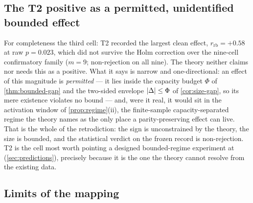 
\subsection{The T2 positive as a permitted, unidentified bounded effect}
\label{subsec:anchor-t2}

For completeness the third cell: T2 recorded the largest clean effect,
$r_{\mathrm{rb}}=+0.58$ at raw $p=0.023$, which did not survive the Holm
correction over the nine-cell confirmatory family ($m=9$; non-rejection on all
nine). The theory neither claims nor needs this as a positive. What it says is
narrow and one-directional: an effect of this magnitude is \emph{permitted} ---
it lies inside the capacity budget $\Phi$ of \cref{thm:bounded-gap} and the
two-sided envelope $|\Delta|\le\Phi$ of \cref{cor:size-gap}, so its mere
existence violates no bound --- and, were it real, it would sit in the
activation window of \cref{prop:regime}(ii), the finite-sample
capacity-separated regime the theory names as the only place a parity-preserving
effect can live. That is the whole of the retrodiction: the sign is
unconstrained by the theory, the size is bounded, and the
statistical verdict on the frozen record is non-rejection. T2 is the cell most
worth pointing a designed bounded-regime experiment at (\cref{sec:predictions}),
precisely because it is the one the theory cannot resolve from the existing
data.

\subsection{Limits of the mapping}
\label{subsec:anchor-limits}

